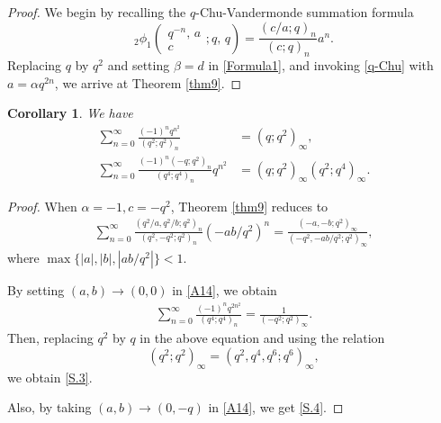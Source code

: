 \documentclass[reqno,12pt]{amsart}
\newtheorem{corollary}[theorem]{Corollary}
\theoremstyle{remark}
\numberwithin{equation}{section}
\begin{document}
\begin{proof}
We begin by recalling  the $q$-Chu-Vandermonde summation formula \cite[Eq. (1.5.3)]{Gasper_and_Rahman}
\begin{equation}\label{q-Chu}
_2\phi_1\left(
\begin{array}{cc}
q^{-n},\,a\\
c
\end{array};q,\,q\right)=\frac{\left(c/a;q\right)_{n}}{\left(c;q\right)_n}a^n.
\end{equation}
Replacing $q$ by $q^2$ and setting $\beta=d$ in \eqref{Formula1}, and invoking \eqref{q-Chu} with $a=\alpha q^{2n}$, we arrive at Theorem \ref{thm9}.
\end{proof}

\begin{corollary}
We have
\begin{align}
\sum_{n=0}^{\infty}\frac{\left(-1\right)^nq^{n^2}}{\left(q^2;q^2\right)_n}
&{=}\left(q;q^2\right)_{\infty},\tag{S.3 and S.23}\label{S.3}\\
\sum_{n=0}^{\infty}\frac{\left(-1\right)^n\left(-q;q^2\right)_n}
{\left(q^4;q^4\right)_n}q^{n^2}
&{=}\left(q;q^2\right)_{\infty}
\left(q^2;q^4\right)_{\infty}.\tag{S.4}\label{S.4}
\end{align}
\end{corollary}
\begin{proof}
When $\alpha=-1, c=-q^2$, Theorem \ref{thm9} reduces to
\begin{align}
\sum_{n=0}^{\infty}\frac{\left(q^2/a,q^2/b;q^2\right)_{n}}{\left(q^2,-q^2;q^2\right)_{n}}
\left(-ab/q^2\right)^n=\frac{\left(-a,-b;q^2\right)_{\infty}}{\left(-q^2,-ab/q^2;q^2\right)_{\infty}}, \label{A14}
\end{align}
where $\max\{|a|,|b|,|ab/q^2|\}<1$. 

By setting $\left(a,b\right)\to\left(0,0\right)$ in \eqref{A14}, we obtain 
\begin{align*}
\sum_{n=0}^{\infty}\frac{\left(-1\right)^nq^{2n^2}}{\left(q^4;q^4\right)_n}=\frac{1}{\left(-q^2;q^2\right)_{\infty}}.
\end{align*}
Then, replacing $q^2$ by $q$ in the above equation and using the relation
\begin{equation*}
\left(q^2;q^2\right)_{\infty}=\left(q^2,q^4,q^6;q^6\right)_{\infty},
\end{equation*}
we obtain \eqref{S.3}.

 Also, by taking $\left(a,b\right)\to\left(0,-q\right)$ in \eqref{A14},  we get \eqref{S.4}.
 \end{proof}
\end{document}
